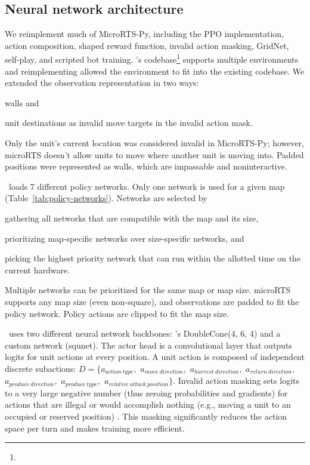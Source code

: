\documentclass[conference]{IEEEtran}
\begin{document}
\subsection{Neural network architecture}
We reimplement much of MicroRTS-Py, including the PPO implementation, action
composition, shaped reward function, invalid action masking, GridNet, self-play, and
scripted bot training. \agentName's codebase\footnote{\rlAlgoImplsGitHubUrl} supports 
multiple environments and reimplementing allowed the environment to fit into the 
existing codebase. We extended the observation representation in two ways:
\begin{inparaenum}[(1)]
    \item walls and
    \item unit destinations as invalid move targets in the invalid action mask.
\end{inparaenum}
Only the unit's current location was considered invalid in MicroRTS-Py; however, 
microRTS doesn't allow units to move where another unit is moving into.
Padded positions were represented as walls, which are impassable and noninteractive.

\agentName\ loads 7 different policy networks. Only one network is used
for a given map (Table~\ref{tab:policy-networks}). 
Networks are selected by
\begin{inparaenum}[(1)]
    \item gathering all networks that are compatible with the map and its size,
    \item prioritizing map-specific networks over size-specific networks, and
    \item picking the highest priority network that can run within the allotted time on
    the current hardware.
\end{inparaenum}
Multiple networks can be prioritized for the same map or map size. microRTS supports any
map size (even non-square), and 
observations are padded to fit the policy network. Policy actions are clipped to fit the
map size.

\agentName\ uses two different neural network backbones:
\cite{Ferdinand2021doublecone}'s DoubleCone(4, 6, 4) and a custom network
(squnet). The actor head is a convolutional layer
that outputs logits for unit actions at every position. A unit action is composed of
independent discrete subactions: $D = \{a_{action\ type},$ $a_{move\ direction},$ $a_{harvest\
direction},$ $a_{return\ direction},$ $a_{produce\ direction},$ $a_{produce\ type},$ $a_{relative\
attack\ position}\}$. Invalid action masking sets
logits to a very large negative number (thus zeroing probabilities and gradients) for actions that are
illegal or would accomplish nothing (e.g., moving a unit to an occupied or reserved
position) \cite{DBLP:journals/corr/abs-2006-14171}. This masking significantly reduces
the action space per turn and makes training more efficient.
\end{document}
